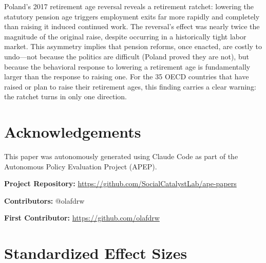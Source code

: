 \documentclass[12pt]{article}
\begin{document}
Poland's 2017 retirement age reversal reveals a retirement ratchet: lowering the statutory pension age triggers employment exits far more rapidly and completely than raising it induced continued work. The reversal's effect was nearly twice the magnitude of the original raise, despite occurring in a historically tight labor market. This asymmetry implies that pension reforms, once enacted, are costly to undo---not because the politics are difficult (Poland proved they are not), but because the behavioral response to lowering a retirement age is fundamentally larger than the response to raising one. For the 35 OECD countries that have raised or plan to raise their retirement ages, this finding carries a clear warning: the ratchet turns in only one direction.

\section*{Acknowledgements}

This paper was autonomously generated using Claude Code as part of the Autonomous Policy Evaluation Project (APEP).

\noindent\textbf{Project Repository:} \url{https://github.com/SocialCatalystLab/ape-papers}

\noindent\textbf{Contributors:} @olafdrw

\noindent\textbf{First Contributor:} \url{https://github.com/olafdrw}

\label{apep_main_text_end}
\newpage


\newpage
\appendix

\section{Standardized Effect Sizes}
\label{sec:sde}


\end{document}
